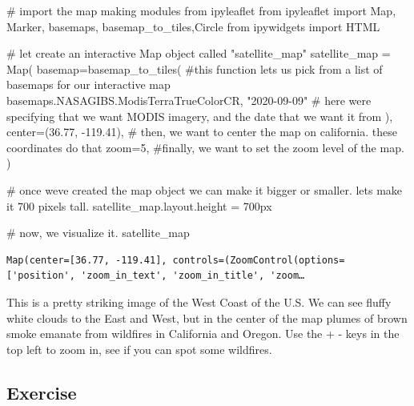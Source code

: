 \documentclass[
  letterpaper,
  DIV=11,
  numbers=noendperiod]{scrreprt}
\newenvironment{Shaded}{\begin{snugshade}}{\end{snugshade}}
\newcommand{\CommentTok}[1]{\textcolor[rgb]{0.37,0.37,0.37}{#1}}
\newcommand{\DecValTok}[1]{\textcolor[rgb]{0.68,0.00,0.00}{#1}}
\newcommand{\FloatTok}[1]{\textcolor[rgb]{0.68,0.00,0.00}{#1}}
\newcommand{\ImportTok}[1]{\textcolor[rgb]{0.00,0.46,0.62}{#1}}
\newcommand{\NormalTok}[1]{\textcolor[rgb]{0.00,0.23,0.31}{#1}}
\newcommand{\OperatorTok}[1]{\textcolor[rgb]{0.37,0.37,0.37}{#1}}
\newcommand{\StringTok}[1]{\textcolor[rgb]{0.13,0.47,0.30}{#1}}
\begin{document}
\begin{Shaded}
\begin{Highlighting}[]
\CommentTok{\# import the map making modules from ipyleaflet}
\ImportTok{from}\NormalTok{ ipyleaflet }\ImportTok{import}\NormalTok{ Map, Marker, basemaps, basemap\_to\_tiles,Circle}
\ImportTok{from}\NormalTok{ ipywidgets }\ImportTok{import}\NormalTok{ HTML}

\CommentTok{\# let create an interactive Map object called "satellite\_map"}
\NormalTok{satellite\_map }\OperatorTok{=}\NormalTok{ Map(}
\NormalTok{  basemap}\OperatorTok{=}\NormalTok{basemap\_to\_tiles( }\CommentTok{\#this function lets us pick from a list of basemaps for our interactive map}
\NormalTok{    basemaps.NASAGIBS.ModisTerraTrueColorCR, }\StringTok{"2020{-}09{-}09"} \CommentTok{\# here we\textquotesingle{}re specifying that we want MODIS imagery, and the date that we want it from  }
\NormalTok{  ),}
\NormalTok{  center}\OperatorTok{=}\NormalTok{(}\FloatTok{36.77}\NormalTok{, }\OperatorTok{{-}}\FloatTok{119.41}\NormalTok{), }\CommentTok{\# then, we want to center the map on california. these coordinates do that}
\NormalTok{  zoom}\OperatorTok{=}\DecValTok{5}\NormalTok{, }\CommentTok{\#finally, we want to set the zoom level of the map. }
\NormalTok{)}

\CommentTok{\# once we\textquotesingle{}ve created the map object we can make it bigger or smaller. let\textquotesingle{}s make it 700 pixels tall. }
\NormalTok{satellite\_map.layout.height }\OperatorTok{=} \StringTok{\textquotesingle{}700px\textquotesingle{}}

\CommentTok{\# now, we visualize it.}
\NormalTok{satellite\_map}
\end{Highlighting}
\end{Shaded}

\begin{verbatim}
Map(center=[36.77, -119.41], controls=(ZoomControl(options=['position', 'zoom_in_text', 'zoom_in_title', 'zoom…
\end{verbatim}

This is a pretty striking image of the West Coast of the U.S. We can see
fluffy white clouds to the East and West, but in the center of the map
plumes of brown smoke emanate from wildfires in California and Oregon.
Use the + - keys in the top left to zoom in, see if you can spot some
wildfires.

\hypertarget{exercise-7}{%
\subsection{Exercise}\label{exercise-7}}
\end{document}
